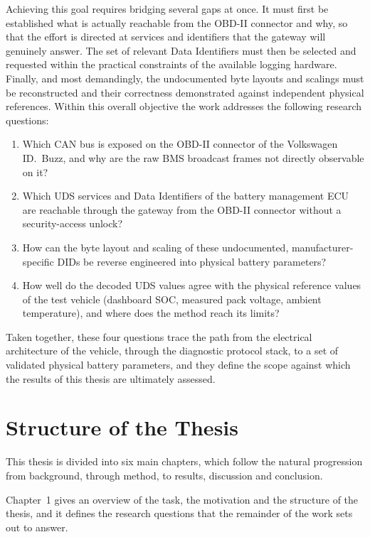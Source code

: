 \documentclass[11pt,a4paper,oneside,parskip=half]{scrreprt}
\begin{document}
Achieving this goal requires bridging several gaps at once. It must first be established what is actually reachable from the OBD-II connector and why, so that the effort is directed at services and identifiers that the gateway will genuinely answer. The set of relevant Data Identifiers must then be selected and requested within the practical constraints of the available logging hardware. Finally, and most demandingly, the undocumented byte layouts and scalings must be reconstructed and their correctness demonstrated against independent physical references. Within this overall objective the work addresses the following research questions:

\begin{enumerate}
  \item Which CAN bus is exposed on the OBD-II connector of the Volkswagen ID.~Buzz, and why are the raw BMS broadcast frames not directly observable on it?
  \item Which UDS services and Data Identifiers of the battery management ECU are reachable through the gateway from the OBD-II connector without a security-access unlock?
  \item How can the byte layout and scaling of these undocumented, manufacturer-specific DIDs be reverse engineered into physical battery parameters?
  \item How well do the decoded UDS values agree with the physical reference values of the test vehicle (dashboard SOC, measured pack voltage, ambient temperature), and where does the method reach its limits?
\end{enumerate}

Taken together, these four questions trace the path from the electrical architecture of the vehicle, through the diagnostic protocol stack, to a set of validated physical battery parameters, and they define the scope against which the results of this thesis are ultimately assessed.

\section{Structure of the Thesis}
This thesis is divided into six main chapters, which follow the natural progression from background, through method, to results, discussion and conclusion.

Chapter~1 gives an overview of the task, the motivation and the structure of the thesis, and it defines the research questions that the remainder of the work sets out to answer.
\end{document}
